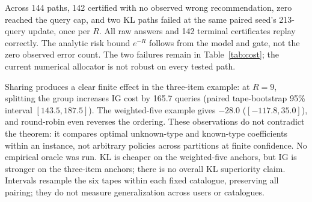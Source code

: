 Across 144 paths, 142 certified with no observed wrong recommendation, zero reached the query cap, and two KL paths failed at the same paired seed's 213-query update, once per $R$. All raw answers and 142 terminal certificates replay correctly. The analytic risk bound $e^{-R}$ follows from the model and gate, not the zero observed error count. The two failures remain in Table~\ref{tab:cost}; the current numerical allocator is not robust on every tested path.

Sharing produces a clear finite effect in the three-item example: at $R=9$, splitting the group increases IG cost by 165.7 queries (paired tape-bootstrap 95\% interval $[143.5,187.5]$). The weighted-five example gives $-28.0$ ($[-117.8,35.0]$), and round-robin even reverses the ordering. These observations do not contradict the theorem: it compares optimal unknown-type and known-type coefficients within an instance, not arbitrary policies across partitions at finite confidence. No empirical oracle was run. KL is cheaper on the weighted-five anchors, but IG is stronger on the three-item anchors; there is no overall KL superiority claim. Intervals resample the six tapes within each fixed catalogue, preserving all pairing; they do not measure generalization across users or catalogues.
